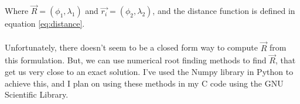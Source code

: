 \documentclass[a4paper]{article}
\begin{document}
Where $\vec{R} = (\phi_{1}, \lambda_{1})$ and $\vec{r_{i}} = (\phi_{2}, \lambda_{2})$, and the distance function is defined in equation \ref{eq:distance}. 

\paragraph{} Unfortunately, there doesn't seem to be a closed form way to compute $\vec{R}$ from this formulation. But, we can use numerical root finding methods to find $\vec{R}$, that get us very close to an exact solution. I've used the Numpy library in Python to achieve this, and I plan on using these methods in my C code using the GNU Scientific Library.




\end{document}

